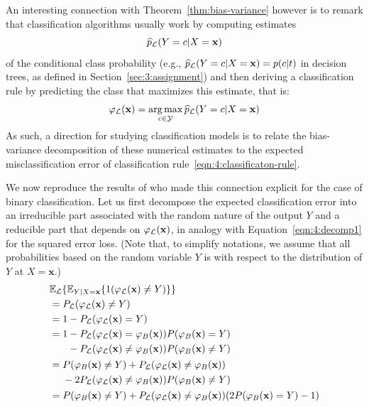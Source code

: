 An interesting connection with Theorem~\ref{thm:bias-variance} however is to
remark that classification algorithms usually work by computing estimates
\begin{equation}\label{eqn:4:proba-estimates}
\widehat{p}_{\cal L}(Y=c|X=\mathbf{x})
\end{equation}
of the conditional class probability (e.g.,
$\widehat{p}_{\cal L}(Y=c|X=\mathbf{x}) = p(c|t)$ in decision trees, as defined in Section~\ref{sec:3:assignment}) and then deriving a classification rule by
predicting the class that maximizes this estimate, that is:
\begin{equation}\label{eqn:4:classificaton-rule}
\varphi_{\cal L}(\mathbf{x}) = \operatorname*{arg\,max}_{c \in {\cal Y}} \widehat{p}_{\cal L}(Y=c|X=\mathbf{x})
\end{equation}
As such, a direction for studying classification models is to relate the
bias-variance decomposition of these numerical estimates to the expected
misclassification error of classification rule~\ref{eqn:4:classificaton-rule}.

We now reproduce the results of \citet{friedman:1997} who made this connection
explicit for the case of binary classification. Let us first decompose the
expected classification error into an irreducible part associated with the
random nature of the output $Y$ and a reducible part that depends on
$\varphi_{\cal L}(\mathbf{x})$, in analogy with Equation~\ref{eqn:4:decomp1}
for the squared error loss. (Note that, to simplify notations, we assume that
all probabilities based on the random variable $Y$ is with respect to the
distribution of $Y$ at $X=\mathbf{x}$.)
\begin{align}
& \mathbb{E}_{\cal L}\{ \mathbb{E}_{Y|X=\mathbf{x}} \{ 1(\varphi_{\cal L}(\mathbf{x}) \neq Y) \} \}  \\
&= P_{{\cal L}}(\varphi_{\cal L}(\mathbf{x}) \neq Y) \nonumber \\
&= 1 - P_{{\cal L}}(\varphi_{\cal L}(\mathbf{x}) = Y) \nonumber \\
&= \begin{aligned}[t]
    1 &- P_{\cal L}(\varphi_{\cal L}(\mathbf{x}) = \varphi_B(\mathbf{x})) P(\varphi_B(\mathbf{x})=Y) \nonumber \\
      &- P_{\cal L}(\varphi_{\cal L}(\mathbf{x}) \neq \varphi_B(\mathbf{x})) P(\varphi_B(\mathbf{x})\neq Y) \nonumber
   \end{aligned}\nonumber \\
&= \begin{aligned}[t]
    &P(\varphi_B(\mathbf{x})\neq Y) + P_{\cal L}(\varphi_{\cal L}(\mathbf{x})\neq \varphi_B(\mathbf{x})) \nonumber \\
    &- 2 P_{\cal L}(\varphi_{\cal L}(\mathbf{x})\neq \varphi_B(\mathbf{x})) P(\varphi_B(\mathbf{x})\neq Y)  \nonumber \\
   \end{aligned}\nonumber \\
&= P(\varphi_B(\mathbf{x})\neq Y) + P_{\cal L}(\varphi_{\cal L}(\mathbf{x})\neq \varphi_B(\mathbf{x}))(2 P(\varphi_B(\mathbf{x}) = Y) - 1) \nonumber
\end{align}

